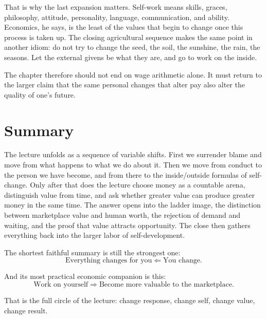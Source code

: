 That is why the last expansion matters. Self-work means skills, graces, philosophy, attitude, personality, language, communication, and ability. Economics, he says, is the least of the values that begin to change once this process is taken up. The closing agricultural sequence makes the same point in another idiom: do not try to change the seed, the soil, the sunshine, the rain, the seasons. Let the external givens be what they are, and go to work on the inside.

The chapter therefore should not end on wage arithmetic alone. It must return to the larger claim that the same personal changes that alter pay also alter the quality of one's future.

\section{Summary}

The lecture unfolds as a sequence of variable shifts. First we surrender blame and move from what happens to what we do about it. Then we move from conduct to the person we have become, and from there to the inside/outside formulas of self-change. Only after that does the lecture choose money as a countable arena, distinguish value from time, and ask whether greater value can produce greater money in the same time. The answer opens into the ladder image, the distinction between marketplace value and human worth, the rejection of demand and waiting, and the proof that value attracts opportunity. The close then gathers everything back into the larger labor of self-development.

The shortest faithful summary is still the strongest one:
\begin{equation}
\text{Everything changes for you} \Longleftarrow \text{You change}.
\end{equation}

And its most practical economic companion is this:
\begin{equation}
\text{Work on yourself} \Longrightarrow \text{Become more valuable to the marketplace}.
\end{equation}

That is the full circle of the lecture: change response, change self, change value, change result.